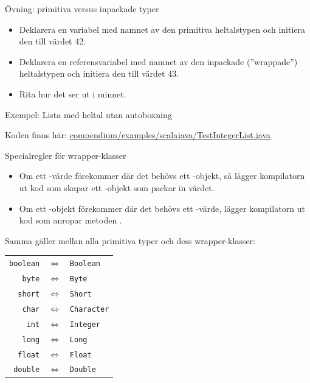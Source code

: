 \begin{Slide}{Övning: primitiva versus inpackade typer}
\begin{itemize}
\item Deklarera en variabel med namnet  av den primitiva heltalstypen och initiera den till värdet 42.
\item Deklarera en referensvariabel med namnet   av den inpackade (''wrappade'') heltalstypen och initiera den till värdet 43.
\item Rita hur det ser ut i minnet.
\end{itemize}
\end{Slide}

\begin{Slide}{Exempel: Lista med heltal utan autoboxning}

\SlideFontTiny Koden finns här: \href{https://github.com/lunduniversity/introprog/tree/master/compendium/examples/scalajava/generics/TestIntegerList.java}{compendium/examples/scalajava/TestIntegerList.java}
\end{Slide}




\begin{Slide}{Specialregler för wrapper-klasser}\SlideFontSmall

\begin{itemize}
\item Om ett -värde förekommer där det behövs ett -objekt, så lägger kompilatorn  ut kod som skapar ett -objekt som packar in värdet.
\item Om ett -objekt förekommer där det behövs ett -värde, lägger kompilatorn  ut kod som anropar metoden .
\end{itemize}
Samma gäller mellan alla primitiva typer och dess wrapper-klasser:

\begin{tabular}{r c l}
 {\lstinline!boolean!} &$\Leftrightarrow$& {\lstinline!Boolean!} \\
 {\lstinline!byte!} &$\Leftrightarrow$& {\lstinline!Byte!}\\
 {\lstinline!short!}&$\Leftrightarrow$& {\lstinline!Short!}\\
 {\lstinline!char!} &$\Leftrightarrow$& {\lstinline!Character!}\\
 {\lstinline!int!} &$\Leftrightarrow$& {\lstinline!Integer!}\\
 {\lstinline!long!} &$\Leftrightarrow$& {\lstinline!Long!}\\
 {\lstinline!float!} &$\Leftrightarrow$& {\lstinline!Float!}\\
 {\lstinline!double!} &$\Leftrightarrow$&{\lstinline!Double!}\\
\end{tabular}

\end{Slide}







